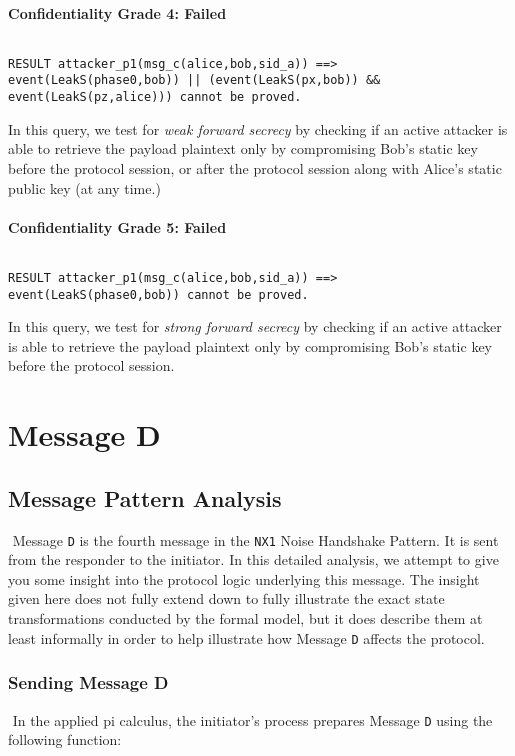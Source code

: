 \paragraph{Confidentiality Grade 4: Failed}$ $
\begin{lstlisting}
RESULT attacker_p1(msg_c(alice,bob,sid_a)) ==> event(LeakS(phase0,bob)) || (event(LeakS(px,bob)) && event(LeakS(pz,alice))) cannot be proved.
\end{lstlisting}

In this query, we test for \emph{weak forward secrecy} by checking if an active attacker is able to retrieve the payload plaintext only by compromising Bob's static key before the protocol session, or after the protocol session along with Alice's static public key (at any time.)


\paragraph{Confidentiality Grade 5: Failed}$ $
\begin{lstlisting}
RESULT attacker_p1(msg_c(alice,bob,sid_a)) ==> event(LeakS(phase0,bob)) cannot be proved.
\end{lstlisting}

In this query, we test for \emph{strong forward secrecy} by checking if an active attacker is able to retrieve the payload plaintext only by compromising Bob's static key before the protocol session.


\section{ Message D}

\subsection{Message Pattern Analysis}$ $
Message \texttt{D} is the fourth message in the \texttt{NX1} Noise Handshake Pattern. It is sent from the responder to the initiator. In this detailed analysis, we attempt to give you some insight into the protocol logic underlying this message. The insight given here does not fully extend down to fully illustrate the exact state transformations conducted by the formal model, but it does describe them at least informally in order to help illustrate how Message \texttt{D} affects the protocol.


\subsubsection{Sending Message D}$ $
In the applied pi calculus, the initiator's process prepares Message \texttt{D} using the following function:



